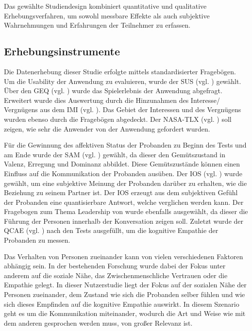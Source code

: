 Das gewählte Studiendesign kombiniert quantitative und qualitative Erhebungsverfahren, um sowohl messbare Effekte als auch subjektive Wahrnehmungen und Erfahrungen der Teilnehmer zu erfassen.

\subsection{Erhebungsinstrumente}

Die Datenerhebung dieser Studie erfolgte mittels standardisierter Fragebögen.
Um die Usability der Anwendung zu evaluieren, wurde der \ac{SUS} (vgl. \cite{brooke_sus_1995}) gewählt. Über den \ac{GEQ} (vgl. \cite{ijsselsteijn_game_2013}) wurde das Spielerlebnis der Anwendung abgefragt. Erweitert wurde dies Auswertung durch die Hinzunahmen des Interesse/ Vergnügens aus dem \ac{IMI} (vgl. \cite{mcauley_psychometric_1989}). Das Gebiet der Interessen und des Vergnügens wurden ebenso durch die Fragebögen abgedeckt. Der \ac{NASA-TLX} (vgl. \cite{hart_nasa-task_2006}) soll zeigen, wie sehr die Anwender von der Anwendung gefordert wurden.

Für die Gewinnung des affektiven Status der Probanden zu Beginn des Tests und am Ende wurde der \ac{SAM} (vgl. \cite{russell_evidence_1977}) gewählt, da dieser den Gemütszustand in Valenz, Erregung und Dominanz abbildet. Diese Gemütszustände können einen Einfluss auf die Kommunikation der Probanden ausüben. Der \ac{IOS} (vgl. \cite{gachter_measuring_2015}) wurde gewählt, um eine subjektive Meinung der Probanden darüber zu erhalten, wie die Beziehung zu seinem Partner ist. Der \ac{IOS} erzeugt aus dem subjektiven Gefühl der Probanden eine quantisierbare Antwort, welche verglichen werden kann. Der Fragebogen zum Thema Leadership von \cite{emmerich_game_2016} wurde ebenfalls ausgewählt, da dieser die Führung der Personen innerhalb der Konversation zeigen soll. Zuletzt wurde der \ac{QCAE} (vgl. \citealp{reniers_qcae_2011}) nach den Tests ausgefüllt, um die kognitive Empathie der Probanden zu messen.

Das Verhalten von Personen zueinander kann von vielen verschiedenen Faktoren abhängig sein. In der bestehenden Forschung wurde dabei der Fokus unter anderem auf die soziale Nähe, das Zwischenmenschliche Vertrauen oder die Empathie gelegt. In dieser Nutzerstudie liegt der Fokus auf der sozialen Nähe der Personen zueinander, dem Zustand wie sich die Probanden selber fühlen und wie sich dieses Empfinden auf die kognitive Empathie auswirkt. In diesem Szenario geht es um die Kommunikation miteinander, wodurch die Art und Weise wie mit dem anderen gesprochen werden muss, von großer Relevanz ist. 

